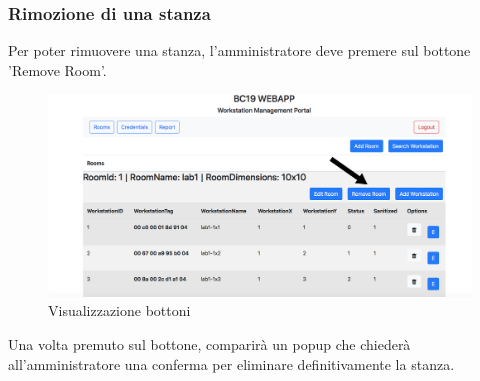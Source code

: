 \subsubsection{Rimozione di una stanza}
Per poter rimuovere una stanza, l'amministratore deve premere sul bottone 'Remove Room'.
\begin{figure}[H]
	\centering
	\includegraphics[width=15cm]{res/images/bottoneRemoveRoom.png}
	\caption{Visualizzazione bottoni}
\end{figure}
Una volta premuto sul bottone, comparirà un popup che chiederà all'amministratore una conferma per eliminare definitivamente la stanza.

